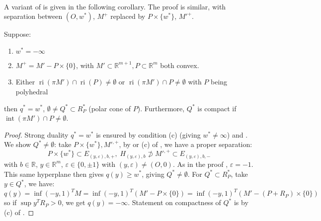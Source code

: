 \paragraph{}A variant of  is given in the following corollary. The proof is similar, with separation between $(O,w^\ast)$, $M^+$ replaced by $P\times \{w^\ast\}$, $M'^{+}$.

\begin{coro}\label{coro:032-variants-reachability}
	Suppose:
	\begin{enumerate}[label=(\alph*)]
		\item $w^\ast=-\infty$
		\item $M^+=M'-P\times \{0\}$, with $M'\subset \mathbb{R}^{m+1},P\subset \mathbb{R}^m$ both convex.
		\item Either $\operatorname{ri}(\pi M')\cap \operatorname{ri}(P)\neq\emptyset$ or $\operatorname{ri}(\pi M')\cap P\neq\emptyset$ with $P$ being polyhedral
	\end{enumerate}
	then $q^\ast=w^\ast$, $\emptyset\neq Q^\ast\subset R_P^\ast$ (polar cone of $P$). Furthermore, $Q^\ast$ is compact if $\operatorname{int}(\pi M')\cap P\neq\emptyset$.
\end{coro}

\begin{proof}
	Strong duality $q^\ast=w^\ast$ is ensured by condition (c) (giving $w^\ast\neq \infty$) and . We show $Q^\ast\neq\emptyset$: take $P\times \{w^\ast\},M'^{,+}$, by  or (c) of , we have a proper separation:
	\[
		P\times \{w^\ast\}\subset E_{(y,\varepsilon ),b,+},\; H_{(y,\varepsilon ),b}\nsupset M'^{,+}\subset E_{(y,\varepsilon ),b,-}
	\]
	with $b\in \mathbb{R}$, $y\in \mathbb{R}^m$, $\varepsilon \in \{0,\pm 1\}$ with $(y,\varepsilon )\neq (O,0)$. As in the proof , $\varepsilon =-1$. This same hyperplane then gives $q(y)\geq w^\ast$, giving $Q^\ast\neq\emptyset$. For $Q^\ast\subset R_P^\ast$, take $y\in Q^\ast$, we have:
	\[
		q(y)=\inf (-y, 1)^TM = \inf (-y, 1)^T\left(M'-P\times \{0\}\right) = \inf (-y, 1)^T\left(M'-(P+R_P)\times \{0\}\right)
	\]
	so if $\sup y^TR_P>0$, we get $q(y)=-\infty$. Statement on compactness of $Q^\ast$ is by (c) of .
\end{proof}

